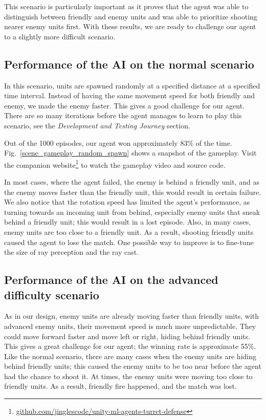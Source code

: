 \documentclass[conference]{IEEEtran}
\begin{document}
This scenario is particularly important as it proves that the agent was able to distinguish between friendly and enemy units and was able to prioritize shooting nearer enemy units first. With these results, we are ready to challenge our agent to a slightly more difficult scenario.

\subsection{Performance of the AI on the normal scenario}

In this scenario, units are spawned randomly at a specified distance at a specified time interval. Instead of having the same movement speed for both friendly and enemy, we made the enemy faster. This gives a good challenge for our agent. There are so many iterations before the agent manages to learn to play this scenario, see the \textit{Development and Testing Journey} section.

Out of the 1000 episodes, our agent won approximately 83\% of the time. Fig.~\ref{scene_gameplay_random_spawn} shows a snapshot of the gameplay. Visit the companion website\footnote{\href{https://github.com/jinglescode/unity-ml-agents-turret-defense}{github.com/jinglescode/unity-ml-agents-turret-defense}} to watch the gameplay video and source code. 

In most cases, where the agent failed, the enemy is behind a friendly unit, and as the enemy moves faster than the friendly unit, this would result in certain failure. We also notice that the rotation speed has limited the agent's performance, as turning towards an incoming unit from behind, especially enemy units that sneak behind a friendly unit; this would result in a lost episode. Also, in many cases, enemy units are too close to a friendly unit. As a result, shooting friendly units caused the agent to lose the match. One possible way to improve is to fine-tune the size of ray perception and the ray cast. 

\subsection{Performance of the AI on the advanced difficulty scenario}

As in our design, enemy units are already moving faster than friendly units, with advanced enemy units, their movement speed is much more unpredictable. They could move forward faster and move left or right, hiding behind friendly units. This gives a great challenge for our agent; the winning rate is approximate 55\%. Like the normal scenario, there are many cases when the enemy units are hiding behind friendly units; this caused the enemy units to be too near before the agent had the chance to shoot it. At times, the enemy units were moving too close to friendly units. As a result, friendly fire happened, and the match was lost.
\end{document}
